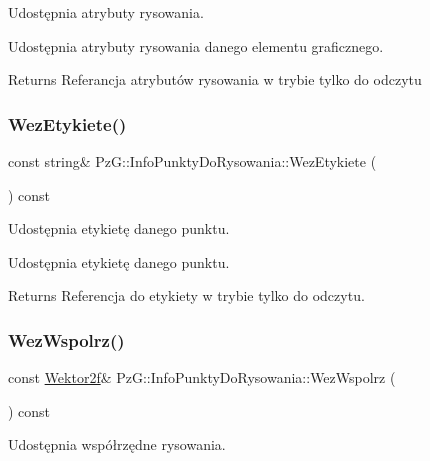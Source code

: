 Udostępnia atrybuty rysowania. 

Udostępnia atrybuty rysowania danego elementu graficznego. \begin{DoxyReturn}{Returns}
Referancja atrybutów rysowania w trybie tylko do odczytu 
\end{DoxyReturn}
\mbox{\label{class_pz_g_1_1_info_punkty_do_rysowania_a385228b5ac60713d115d37d267524ec3}} 
\subsubsection{\texorpdfstring{WezEtykiete()}{WezEtykiete()}}
{\footnotesize\ttfamily const string\& Pz\+G\+::\+Info\+Punkty\+Do\+Rysowania\+::\+Wez\+Etykiete (\begin{DoxyParamCaption}{ }\end{DoxyParamCaption}) const\hspace{0.3cm}{\ttfamily [inline]}}



Udostępnia etykietę danego punktu. 

Udostępnia etykietę danego punktu. \begin{DoxyReturn}{Returns}
Referencja do etykiety w trybie tylko do odczytu. 
\end{DoxyReturn}
\mbox{\label{class_pz_g_1_1_info_punkty_do_rysowania_ae84e4bfa68f132661ff90dac48d83e8c}} 
\subsubsection{\texorpdfstring{WezWspolrz()}{WezWspolrz()}}
{\footnotesize\ttfamily const \mbox{\hyperlink{class_pz_g_1_1_wektor2f}{Wektor2f}}\& Pz\+G\+::\+Info\+Punkty\+Do\+Rysowania\+::\+Wez\+Wspolrz (\begin{DoxyParamCaption}{ }\end{DoxyParamCaption}) const\hspace{0.3cm}{\ttfamily [inline]}}



Udostępnia współrzędne rysowania. 

